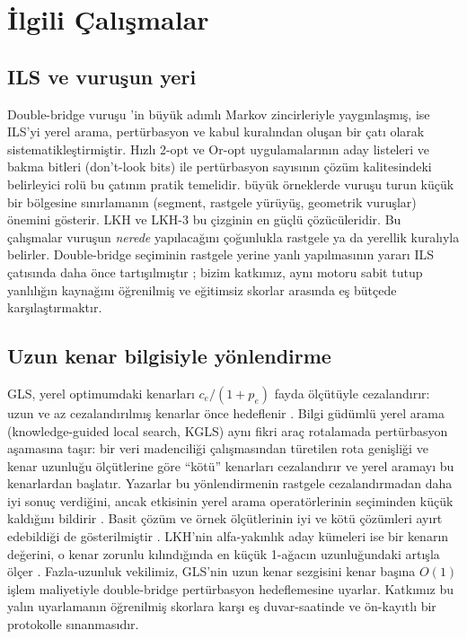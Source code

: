 \documentclass[pdflatex,sn-basic]{sn-jnl}
\begin{document}
\section{İlgili Çalışmalar}\label{sec:ilgili-calismalar}

\subsection{ILS ve vuruşun yeri}
Double-bridge vuruşu \citet{martin_1992_largestep}'in büyük adımlı Markov zincirleriyle yaygınlaşmış,
\citet{lourenco_2010_ils} ise ILS'yi yerel arama, pertürbasyon ve kabul kuralından oluşan bir çatı
olarak sistematikleştirmiştir. Hızlı 2-opt ve Or-opt uygulamalarının aday listeleri ve bakma
bitleri (don't-look bits) \citep{bentley_1992_fast} ile pertürbasyon sayısının çözüm kalitesindeki
belirleyici rolü \citep{johnson_1997_case} bu çatının pratik temelidir. \citet{applegate_2003_clk}
büyük örneklerde vuruşu turun küçük bir bölgesine sınırlamanın (segment, rastgele yürüyüş,
geometrik vuruşlar) önemini gösterir. LKH \citep{helsgaun_2000_lkh} ve LKH-3 \citep{helsgaun_2017_lkh3}
bu çizginin en güçlü çözücüleridir. Bu çalışmalar vuruşun \emph{nerede} yapılacağını çoğunlukla
rastgele ya da yerellik kuralıyla belirler. Double-bridge seçiminin rastgele yerine yanlı
yapılmasının yararı ILS çatısında daha önce tartışılmıştır \citep{lourenco_2010_ils}; bizim
katkımız, aynı motoru sabit tutup yanlılığın kaynağını öğrenilmiş ve eğitimsiz skorlar arasında eş
bütçede karşılaştırmaktır.

\subsection{Uzun kenar bilgisiyle yönlendirme}
GLS, yerel optimumdaki kenarları $c_e/(1+p_e)$ fayda ölçütüyle cezalandırır: uzun ve az
cezalandırılmış kenarlar önce hedeflenir \citep{voudouris_1999_gls}. Bilgi güdümlü yerel arama (knowledge-guided local search, KGLS) aynı fikri araç rotalamada pertürbasyon aşamasına taşır: bir veri madenciliği çalışmasından türetilen rota genişliği ve kenar uzunluğu ölçütlerine göre ``kötü'' kenarları cezalandırır ve yerel aramayı bu kenarlardan başlatır. Yazarlar bu yönlendirmenin rastgele cezalandırmadan daha iyi sonuç verdiğini, ancak etkisinin yerel arama operatörlerinin seçiminden küçük kaldığını bildirir \citep{arnold_2019_kgls}. Basit
çözüm ve örnek ölçütlerinin iyi ve kötü çözümleri ayırt edebildiği de gösterilmiştir
\citep{arnold_2019_vrpgood}. LKH'nin alfa-yakınlık aday kümeleri ise bir kenarın değerini, o kenar zorunlu kılındığında en küçük 1-ağacın uzunluğundaki artışla ölçer \citep{helsgaun_2000_lkh}. Fazla-uzunluk vekilimiz, GLS'nin uzun kenar sezgisini kenar başına $O(1)$ işlem maliyetiyle
double-bridge pertürbasyon hedeflemesine uyarlar. Katkımız bu yalın uyarlamanın öğrenilmiş
skorlara karşı eş duvar-saatinde ve ön-kayıtlı bir protokolle sınanmasıdır.
\end{document}
